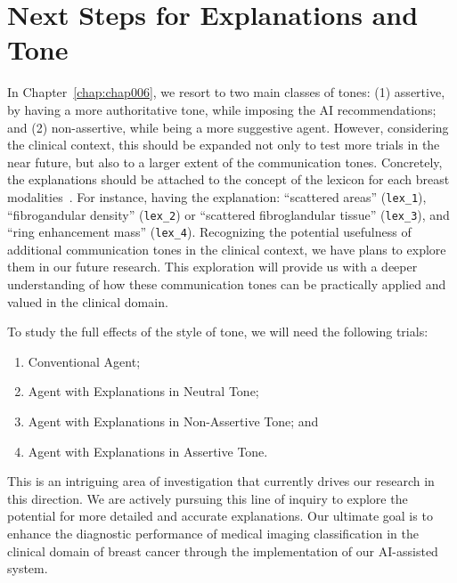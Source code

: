 \section{Next Steps for Explanations and Tone}
\label{sec:app005015}

In Chapter~\ref{chap:chap006}, we resort to two main classes of tones:
(1) assertive, by having a more authoritative tone, while imposing the \ac{AI} recommendations; and
(2) non-assertive, while being a more suggestive agent.
However, considering the clinical context, this should be expanded not only to test more trials in the near future, but also to a larger extent of the communication tones.
Concretely, the explanations should be attached to the concept of the lexicon for each breast modalities~\cite{SPAK2017179}.
For instance, having the explanation: ``scattered areas'' (\texttt{lex\_1}), ``fibrogandular density'' (\texttt{lex\_2})  or ``scattered fibroglandular tissue'' (\texttt{lex\_3}), and ``ring enhancement mass'' (\texttt{lex\_4}).
Recognizing the potential usefulness of additional communication tones in the clinical context, we have plans to explore them in our future research.
This exploration will provide us with a deeper understanding of how these communication tones can be practically applied and valued in the clinical domain.

\vspace{2.00mm}

\noindent
To study the full effects of the style of tone, we will need the following trials:

\vspace{0.05mm}

\begin{enumerate}
\item Conventional Agent;
\item Agent with Explanations in Neutral Tone;
\item Agent with Explanations in Non-Assertive Tone; and
\item Agent with Explanations in Assertive Tone.
\end{enumerate}


This is an intriguing area of investigation that currently drives our research in this direction.
We are actively pursuing this line of inquiry to explore the potential for more detailed and accurate explanations.
Our ultimate goal is to enhance the diagnostic performance of medical imaging classification in the clinical domain of breast cancer through the implementation of our \ac{AI}-assisted system.

